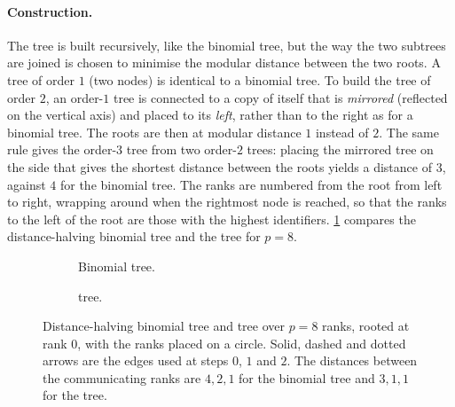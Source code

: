 \paragraph{Construction.}
The \bine{} tree is built recursively, like the binomial tree, but the way the two subtrees are joined is chosen to minimise the modular distance between the two roots.
A \bine{} tree of order $1$ (two nodes) is identical to a binomial tree.
To build the tree of order $2$, an order-$1$ tree is connected to a copy of itself that is \emph{mirrored} (reflected on the vertical axis) and placed to its \emph{left}, rather than to the right as for a binomial tree.
The roots are then at modular distance $1$ instead of $2$.
The same rule gives the order-$3$ tree from two order-$2$ trees: placing the mirrored tree on the side that gives the shortest distance between the roots yields a distance of $3$, against $4$ for the binomial tree.
The ranks are numbered from the root from left to right, wrapping around when the rightmost node is reached, so that the ranks to the left of the root are those with the highest identifiers.
\cref{fig:bg-bine-circle} compares the distance-halving binomial tree and the \bine{} tree for $p=8$.

\begin{figure}[t]
  \centering
  \begin{subfigure}[t]{0.48\linewidth}
    \centering
    \caption{Binomial tree.}
  \end{subfigure}\hfill
  \begin{subfigure}[t]{0.48\linewidth}
    \centering
    \caption{\bine{} tree.}
  \end{subfigure}
  \caption{Distance-halving binomial tree and \bine{} tree over $p=8$ ranks, rooted at rank $0$, with the ranks placed on a circle. Solid, dashed and dotted arrows are the edges used at steps $0$, $1$ and $2$. The distances between the communicating ranks are $4,2,1$ for the binomial tree and $3,1,1$ for the \bine{} tree.}
  \label{fig:bg-bine-circle}
\end{figure}

